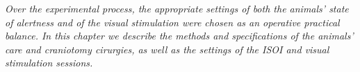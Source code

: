 \label{cap:Experimental-methods}

\textit{Over the experimental process, the appropriate settings of both the animals' state of alertness and of the visual stimulation were chosen as an operative practical balance. In this chapter we describe the methods and specifications of the animals' care and craniotomy cirurgies, as well as the settings of the ISOI and visual stimulation sessions.}






\cleardoublepage